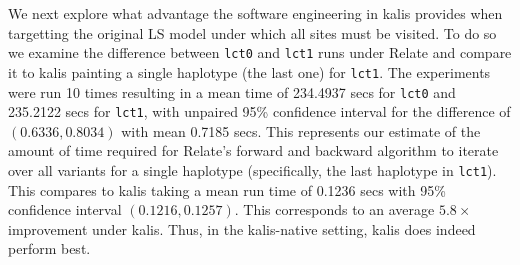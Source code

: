 \documentclass[a4paper]{article}
\newcommand{\pkg}[1]{{\fontseries{m}\fontseries{b}\selectfont #1}}
\begin{document}
We next explore what advantage the software engineering in \pkg{kalis} provides when targetting the original LS model under which all sites must be visited.
To do so we examine the difference between \texttt{lct0} and \texttt{lct1} runs under Relate and compare it to \pkg{kalis} painting a single haplotype (the last one) for \texttt{lct1}.
The experiments were run 10 times resulting in a mean time of 234.4937 secs for \texttt{lct0} and 235.2122 secs for \texttt{lct1}, with unpaired 95\% confidence interval for the difference of $(0.6336,0.8034)$ with mean 0.7185 secs.
This represents our estimate of the amount of time required for Relate's forward and backward algorithm to iterate over all variants for a single haplotype (specifically, the last haplotype in \texttt{lct1}).
This compares to \pkg{kalis} taking a mean run time of 0.1236 secs with 95\% confidence interval $(0.1216, 0.1257)$.
This corresponds to an average $5.8\times$ improvement under \pkg{kalis}.
Thus, in the \pkg{kalis}-native setting, \pkg{kalis} does indeed perform best.





\end{document}
